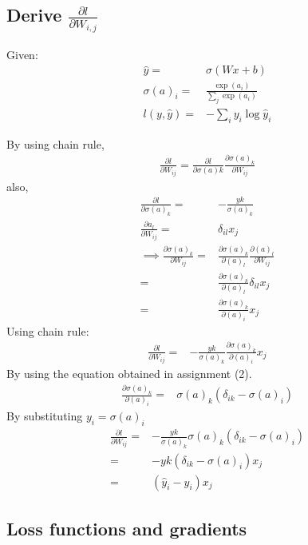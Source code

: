 \documentclass{article}
\begin{document}
\subsection{Derive $\frac{\partial l}{\partial W_{i,j}}$}
Given:
\begin{align*}
  \hat{y} =& \sigma{(Wx+b)} \\
  \sigma{(a)}_{i} =& \frac{\exp(a_{i})}{\sum_{j} \exp(a_{i})} \\
  l(y, \hat{y}) =& -\sum_{i} y_{i} \log \hat{y}_{i}
\end{align*}

By using chain rule,
\begin{align*}
  \frac{\partial l}{\partial W_{ij}} = \frac{\partial l}{\partial \sigma{(a)}{k}}\frac{\partial\sigma{(a)}_{k}}{\partial W_{ij}}
\end{align*}
also,
\begin{align*}
  \frac{\partial l}{\partial \sigma{(a)}_{k}} =&  -\frac{yk}{\sigma{(a)}_{k}} \\
  \frac{\partial a_{l}}{\partial W_{ij}} =&  \delta_{il}x_{j} \\
  \implies \frac{\partial \sigma{(a)}_{k}}{\partial W_{ij}} =& \frac{\partial \sigma{(a)}_{k}}{\partial {(a)}_{l}} \frac{\partial {(a)}_{l}}{\partial W_{ij}} \\
  =& \frac{\partial \sigma{(a)}_{k}}{\partial {(a)}_{l}} \delta_{il}x_{j} \\
  =& \frac{\partial \sigma{(a)}_{k}}{\partial {(a)}_{i}} x_{j}
\end{align*}
Using chain rule:
\begin{align*}
  \frac{\partial l}{\partial W_{ij}} =& -\frac{yk}{\sigma{(a)}_{k}} \frac{\partial \sigma{(a)}_{k}}{\partial {(a)}_{i}} x_{j} 
\end{align*}
By using the equation obtained in assignment (2).
\begin{align*}
  \frac{\partial \sigma{(a)}_{k}}{\partial {(a)}_{i}} =& \sigma{(a)}_{k} (\delta_{ik} - \sigma{(a)}_{i})
\end{align*}
By substituting $y_{i} = \sigma{(a)}_{i}$
\begin{align*}
  \frac{\partial l}{\partial W_{ij}} =& -\frac{yk}{\sigma{(a)}_{k}} \sigma{(a)}_{k} (\delta_{ik} - \sigma{(a)}_{i}) \\
  =& -yk (\delta_{ik} - \sigma{(a)}_{i})x_{j} \\
  =& (\hat{y}_{i} - y_{i})x_{j}
\end{align*}

\subsection{Loss functions and gradients}
\end{document}
